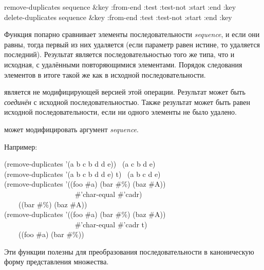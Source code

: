 \begin{defun}[Функция]
remove-duplicates sequence &key :from-end :test :test-not :start :end :key \\
delete-duplicates sequence &key :from-end :test :test-not :start :end :key

Функция попарно сравнивает элементы последовательности \emph{sequence}, и если
они равны, тогда первый из них удаляется (если параметр  равен
истине, то удаляется последний).
Результат является последовательностью того же типа, что и исходная, с
удалёнными повторяющимися элементами. Порядок следования элементов в итоге такой
же как в исходной последовательности.

 является не модифицирующей версией этой операции.
Результат  может быть \emph{соединён} с исходной
последовательностью. Также результат может быть равен  исходной
последовательности, если ни одного элементы не было удалено.

 может модифицировать аргумент \emph{sequence}.

Например:
\begin{lisp}
(remove-duplicates '(a b c b d d e)) \EV\ (a c b d e) \\
(remove-duplicates '(a b c b d d e)  t) \EV\ (a b c d e) \\
(remove-duplicates '((foo \#{\Xbackslash}a) (bar \#{\Xbackslash}\%) (baz \#{\Xbackslash}A)) \\
~~~~~~~~~~~~~~~~~~~ \#'char-equal  \#'cadr) \\
~~~\EV\ ((bar \#{\Xbackslash}\%) (baz \#{\Xbackslash}A)) \\
(remove-duplicates '((foo \#{\Xbackslash}a) (bar \#{\Xbackslash}\%) (baz \#{\Xbackslash}A)) \\
~~~~~~~~~~~~~~~~~~~ \#'char-equal  \#'cadr  t) \\
~~~\EV\ ((foo \#{\Xbackslash}a) (bar \#{\Xbackslash}\%))
\end{lisp}

Эти функции полезны для преобразования последовательности в каноническую форму
представления множества.
\end{defun}

